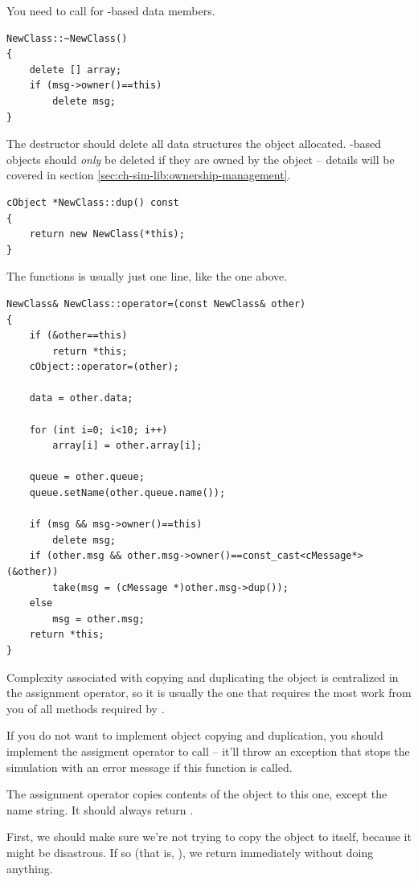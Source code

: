 You need to call  for -based data members.

\begin{verbatim}
NewClass::~NewClass()
{
    delete [] array;
    if (msg->owner()==this)
        delete msg;
}
\end{verbatim}

The destructor should delete all data structures the object allocated.
-based objects should \textit{only} be deleted if they
are owned by the object -- details will be covered in section
\ref{sec:ch-sim-lib:ownership-management}.

\begin{verbatim}
cObject *NewClass::dup() const
{
    return new NewClass(*this);
}
\end{verbatim}

The  functions is usually just one line, like the one above.

\begin{verbatim}
NewClass& NewClass::operator=(const NewClass& other)
{
    if (&other==this)
        return *this;
    cObject::operator=(other);

    data = other.data;

    for (int i=0; i<10; i++)
        array[i] = other.array[i];

    queue = other.queue;
    queue.setName(other.queue.name());

    if (msg && msg->owner()==this)
        delete msg;
    if (other.msg && other.msg->owner()==const_cast<cMessage*>(&other))
        take(msg = (cMessage *)other.msg->dup());
    else
        msg = other.msg;
    return *this;
}
\end{verbatim}

Complexity associated with copying and duplicating the object
is centralized in the assignment operator, so it is usually
the one that requires the most work from you of all methods
required by .

If you do not want to implement object copying and duplication,
you should implement the assigment operator to call
 -- it'll throw an exception that
stops the simulation with an error message if this function
is called.

The assignment operator copies contents of the  object
to this one, except the name string. It should always return
.

First, we should make sure we're not trying to copy the object
to itself, because it might be disastrous. If so (that is,
), we return immediately without doing anything.

